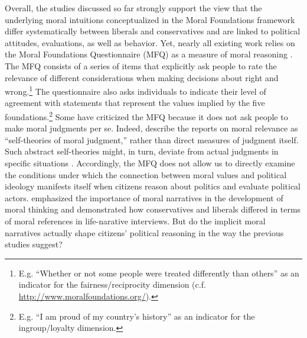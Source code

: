 \documentclass[12pt]{article}
\begin{document}
Overall, the studies discussed so far strongly support the view that the underlying moral intuitions conceptualized in the Moral Foundations framework differ systematically between liberals and conservatives and are linked to political attitudes, evaluations, as well as behavior. Yet, nearly all existing work relies on the Moral Foundations Questionnaire (MFQ) as a measure of moral reasoning \citep[but see][]{clifford2014linking}. The MFQ consists of a series of items that explicitly ask people to rate the relevance of different considerations when making decisions about right and wrong.\footnote{E.g. ``Whether or not some people were treated differently than others'' as an indicator for the fairness/reciprocity dimension (c.f. \url{http://www.moralfoundations.org/}).} The questionnaire also asks individuals to indicate their level of agreement with statements that represent the values implied by the five foundations.\footnote{E.g. ``I am proud of my country’s history'' as an indicator for the ingroup/loyalty dimension.} Some have criticized the MFQ because it does not ask people to make moral judgments per se. Indeed, \citet[1031]{graham2009liberals} describe the reports on moral relevance as ``self-theories of moral judgment,'' rather than direct measures of judgment itself. Such abstract self-theories might, in turn, deviate from actual judgments in specific situations \citep[see][for an alternative way to measure moral judgment]{clifford2015moral}. Accordingly, the MFQ does not allow us to directly examine the conditions under which the connection between moral values and political ideology manifests itself when citizens reason about politics and evaluate political actors. \citet{haidt2008moral} emphasized the importance of moral narratives in the development of moral thinking and \citet{mcadams2008family} demonstrated how conservatives and liberals differed in terms of moral references in life-narative interviews. But do the implicit moral narratives actually shape citizens' political reasoning in the way the previous studies suggest?
\end{document}
